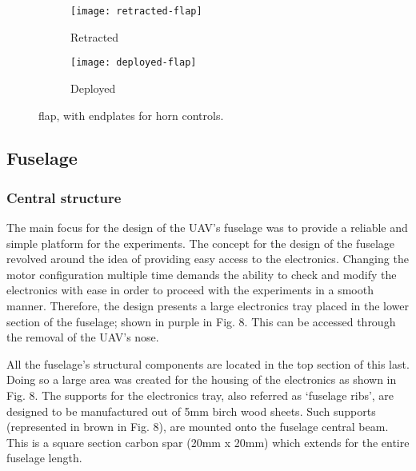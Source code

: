 \documentclass[../../main.tex]{subfiles}
\begin{document}

\begin{figure}[H]

    \centering
    \begin{subfigure}[b]{0.49\columnwidth}
        \centering
        \texttt{[image: retracted-flap]}
        \caption{Retracted}
        \label{fig:flaps:retracted}
    \end{subfigure}
    \hfill
    \begin{subfigure}[b]{0.49\columnwidth}
        \centering
        \texttt{[image: deployed-flap]}
        \caption{Deployed}
        \label{fig:flaps:deployed}
    \end{subfigure}
    
    \caption{flap, with endplates for horn controls.}
    \label{fig:flaps}
\end{figure}

\subsection{Fuselage} \label{sec:design-process:final-design-proposal:fuselage}

\subsubsection{Central structure} \label{sec:design-process:final-design-proposal:fuselage:central-structure}

The main focus for the design of the UAV’s fuselage was to provide a reliable and simple platform for the experiments.
The concept for the design of the fuselage revolved around the idea of providing easy access to the electronics.
Changing the motor configuration multiple time demands the ability to check and modify the electronics with ease in order to proceed with the experiments in a smooth manner.
Therefore, the design presents a large electronics tray placed in the lower section of the fuselage; shown in purple in Fig. 8.
This can be accessed through the removal of the UAV’s nose.


All the fuselage’s structural components are located in the top section of this last.
Doing so a large area was created for the housing of the electronics as shown in Fig. 8.
The supports for the electronics tray, also referred as ‘fuselage ribs’, are designed to be manufactured out of 5mm birch wood sheets.
Such supports (represented in brown in Fig. 8), are mounted onto the fuselage central beam.
This is a square section carbon spar (20mm x 20mm) which extends for the entire fuselage length. 
\end{document}
